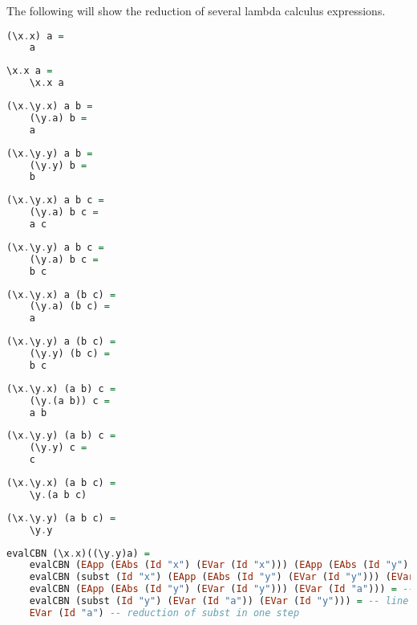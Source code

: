\documentclass{article}
\theoremstyle{theorem}
\theoremstyle{definition}
\theoremstyle{remark}
\begin{document}
\noindent The following will show the reduction of several lambda calculus expressions.
\begin{lstlisting}[language=Haskell]
(\x.x) a =
    a
\end{lstlisting}
\begin{lstlisting}[language=Haskell]
\x.x a =
    \x.x a
\end{lstlisting}
\begin{lstlisting}[language=Haskell]
(\x.\y.x) a b =
    (\y.a) b =
    a
\end{lstlisting}
\begin{lstlisting}[language=Haskell]
(\x.\y.y) a b =
    (\y.y) b =
    b
\end{lstlisting}
\newpage
\begin{lstlisting}[language=Haskell]
(\x.\y.x) a b c =
    (\y.a) b c =
    a c
\end{lstlisting}
\begin{lstlisting}[language=Haskell]
(\x.\y.y) a b c =
    (\y.a) b c =
    b c
\end{lstlisting}
\begin{lstlisting}[language=Haskell]
(\x.\y.x) a (b c) =
    (\y.a) (b c) =
    a
\end{lstlisting}
\begin{lstlisting}[language=Haskell]
(\x.\y.y) a (b c) =
    (\y.y) (b c) =
    b c
\end{lstlisting}
\begin{lstlisting}[language=Haskell]
(\x.\y.x) (a b) c =
    (\y.(a b)) c =
    a b
\end{lstlisting}
\begin{lstlisting}[language=Haskell]
(\x.\y.y) (a b) c =
    (\y.y) c =
    c
\end{lstlisting}
\begin{lstlisting}[language=Haskell]
(\x.\y.x) (a b c) =
    \y.(a b c)
\end{lstlisting}
\begin{lstlisting}[language=Haskell]
(\x.\y.y) (a b c) =
    \y.y
\end{lstlisting}
\begin{lstlisting}[language=Haskell]
evalCBN (\x.x)((\y.y)a) =
    evalCBN (EApp (EAbs (Id "x") (EVar (Id "x"))) (EApp (EAbs (Id "y") (EVar (Id "y"))) (EVar (Id "a")))) = -- converted to concrete format
    evalCBN (subst (Id "x") (EApp (EAbs (Id "y") (EVar (Id "y"))) (EVar (Id "a"))) (EVar (Id "x"))) = -- line 27
    evalCBN (EApp (EAbs (Id "y") (EVar (Id "y"))) (EVar (Id "a"))) = -- reduction of subst in one step
    evalCBN (subst (Id "y") (EVar (Id "a")) (EVar (Id "y"))) = -- line 27
    EVar (Id "a") -- reduction of subst in one step
\end{lstlisting}
\newpage
\end{document}
